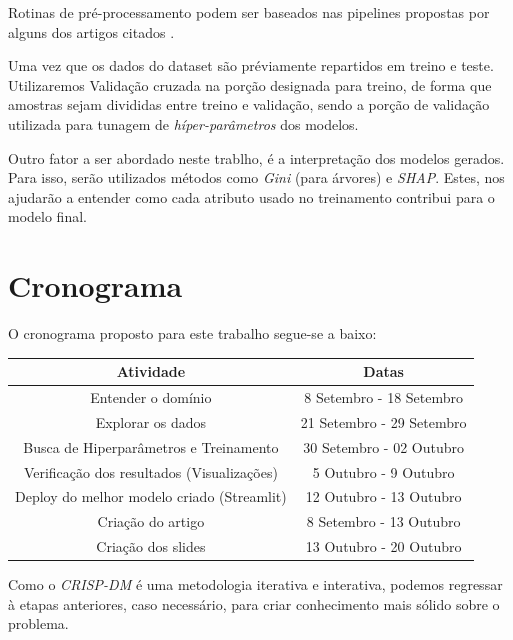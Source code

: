\documentclass{paper}
\begin{document}
Rotinas de pré-processamento podem ser baseados nas pipelines propostas por alguns dos artigos citados \cite{4Methods,Multimodal,Review}.

Uma vez que os dados do dataset são préviamente repartidos em treino e teste. Utilizaremos Validação cruzada na porção designada para treino, de forma que amostras sejam divididas entre treino e validação, sendo a porção de validação utilizada para tunagem de \textit{híper-parâmetros} dos modelos.

Outro fator a ser abordado neste trablho, é a interpretação dos modelos gerados. Para isso, serão utilizados métodos como \textit{Gini} (para árvores) e \textit{SHAP}. Estes, nos ajudarão a entender como cada atributo usado no treinamento contribui para o modelo final.

\section{Cronograma}

O cronograma proposto para este trabalho segue-se a baixo:

\begin{center}
	\begin{tabular}{ |c|c| } 
		\hline
		Atividade & Datas \\
		\hline
		Entender o domínio & 8 Setembro - 18 Setembro  \\ 
		Explorar os dados & 21 Setembro - 29 Setembro \\ 
		Busca de Hiperparâmetros e Treinamento  & 30 Setembro - 02 Outubro \\ 
		Verificação dos resultados (Visualizações)  & 5 Outubro - 9 Outubro \\ 
		Deploy do melhor modelo criado (Streamlit)  & 12 Outubro - 13 Outubro \\ 
		\hline
		Criação do artigo & 8 Setembro - 13 Outubro\\
		Criação dos slides & 13 Outubro - 20 Outubro\\
		\hline
	\end{tabular}
\end{center}

Como o \textit{CRISP-DM} é uma metodologia iterativa e interativa, podemos regressar à etapas anteriores, caso necessário, para criar conhecimento mais sólido sobre o problema. 


	
\end{document}
